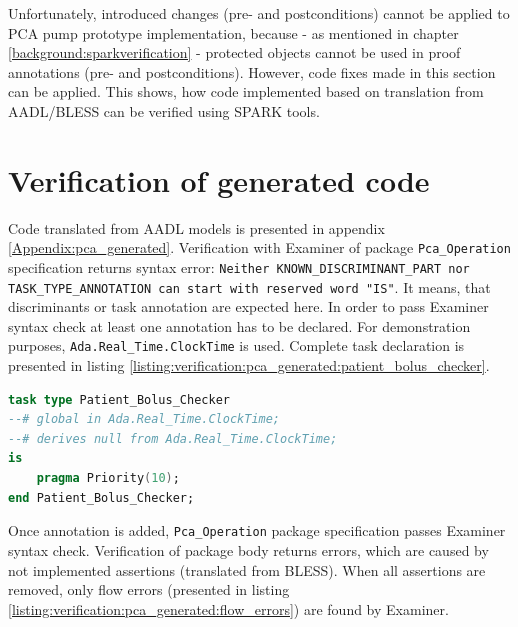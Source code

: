 Unfortunately, introduced changes (pre- and postconditions) cannot be applied to PCA pump prototype implementation, because - as mentioned in chapter \ref{background:sparkverification} - protected objects cannot be used in proof annotations (pre- and postconditions). However, code fixes made in this section can be applied. This shows, how code implemented based on translation from AADL/BLESS can be verified using SPARK tools.



\section{Verification of generated code}
\label{verification:generated}

Code translated from AADL models is presented in appendix \ref{Appendix:pca_generated}. Verification with Examiner of package \lstinline{Pca_Operation} specification returns syntax error: \lstinline{Neither KNOWN_DISCRIMINANT_PART nor TASK_TYPE_ANNOTATION can start with reserved word "IS"}. It means, that discriminants or task annotation are expected here. In order to pass Examiner syntax check at least one annotation has to be declared. For demonstration purposes, \lstinline{Ada.Real_Time.ClockTime} is used. Complete task declaration is presented in listing \ref{listing:verification:pca_generated:patient_bolus_checker}.

\singlespacing
\begin{lstlisting}[language=ada, frame=single, gobble=0, caption={Undischarged Verification Condition from sum.siv file}, label={listing:verification:pca_generated:patient_bolus_checker}]
task type Patient_Bolus_Checker
--# global in Ada.Real_Time.ClockTime;
--# derives null from Ada.Real_Time.ClockTime;
is
    pragma Priority(10);
end Patient_Bolus_Checker;
\end{lstlisting}
\doublespacing

Once annotation is added, \lstinline{Pca_Operation} package specification passes Examiner syntax check. Verification of package body returns errors, which are caused by not implemented assertions (translated from BLESS). When all assertions are removed, only flow errors (presented in listing \ref{listing:verification:pca_generated:flow_errors}) are found by Examiner. 

